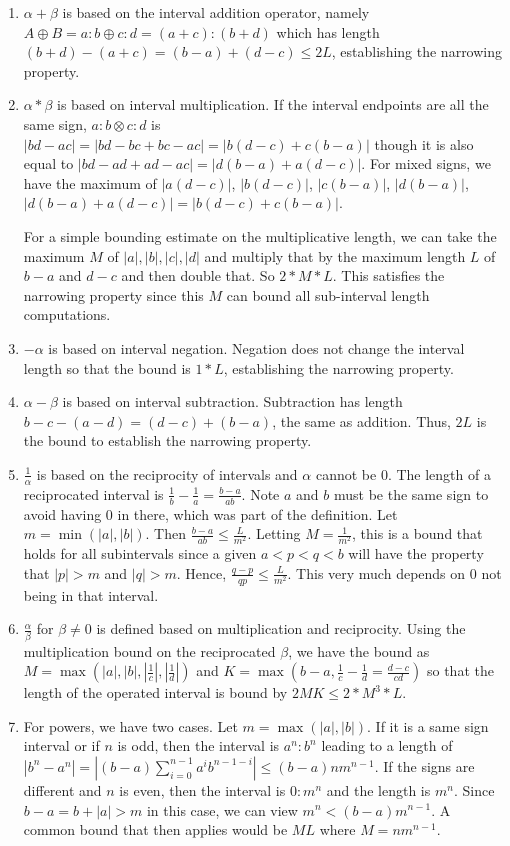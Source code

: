 \documentclass[12pt]{article}
\begin{document}
\begin{enumerate}
    \item $\alpha+\beta$ is based on the interval addition operator, namely $A \oplus B = a:b \oplus c:d = (a+c):(b+d)$ which has length $(b+d) - (a+c) = (b-a) + (d-c) \leq 2L$, establishing the narrowing property. 
    \item $\alpha * \beta$ is based on interval multiplication. If the interval endpoints are all the same sign, $a:b \otimes c:d$ is $|bd-ac| = |bd -bc + bc -ac| =  |b(d-c) + c(b-a)|$ though it is also equal to $|bd - ad + ad - ac| = |d(b-a) + a(d-c)|$. For mixed signs, we have the maximum of $|a(d-c)|$, $|b(d-c)|$, $|c(b-a)|$, $|d(b-a)|$, $|d(b-a)+a(d-c)| = |b(d-c) + c(b-a)|$. 
    
    For a simple bounding estimate on the multiplicative length, we can take the maximum $M$ of $|a|, |b|, |c|, |d|$ and multiply that by the maximum length $L$ of $b-a$ and $d-c$ and then double that. So $2*M*L$. This satisfies the narrowing property since this $M$ can bound all sub-interval length computations.
    \item $-\alpha$ is based on interval negation. Negation does not change the interval length so that the bound is $1*L$, establishing the narrowing property. 
    \item $\alpha - \beta$ is based on interval subtraction. Subtraction has length $b-c - (a-d) = (d-c) + (b-a)$, the same as addition. Thus, $2L$ is the bound to establish the narrowing property. 
    \item $\frac{1}{\alpha}$ is based on the reciprocity of intervals and $\alpha$ cannot be $0$. The length of a reciprocated interval is $\frac{1}{b} - \frac{1}{a} = \tfrac{b-a}{ab}$. Note $a$ and $b$ must be the same sign to avoid having 0 in there, which was part of the definition. Let $m = \min(|a|, |b|)$. Then $\tfrac{b-a}{ab} \leq \tfrac{L}{m^2}$. Letting $M = \tfrac{1}{m^2}$, this is a bound that holds for all subintervals since a given $a < p < q < b$ will have the property that $|p| > m$ and $|q| > m$. Hence, $\frac{q-p}{qp} \leq \frac{L}{m^2}$. This very much depends on $0$ not being in that interval. 
    \item $\tfrac{\alpha}{\beta}$ for $\beta \neq 0$ is defined based on multiplication and reciprocity. Using the multiplication bound on the reciprocated $\beta$, we have the bound as $M = \max(|a|, |b|, |\frac{1}{c}|, |\frac{1}{d}|)$ and $K= \max(b-a, \frac{1}{c} - \frac{1}{d}= \tfrac{d-c}{cd} )$ so that the length of the operated interval is bound by $2MK \leq 2*M^3*L$.
    \item For powers, we have two cases. Let $m = \max(|a|, |b|)$. If it is a same sign interval or if $n$ is odd, then the interval is $a^n : b^n$ leading to a length of $|b^n - a^n| = |(b-a)\sum_{i=0}^{n-1} a^i b^{n-1-i}| \leq (b-a)n m^{n-1}$. If the signs are different and $n$ is even, then the interval is $0:m^n$ and the length is $m^n$. Since $b-a = b+ |a| > m$ in this case, we can view $m^n < (b-a) m^{n-1}$. A common bound that then applies would be $M L$ where $M = n m^{n-1}$. 
    

\end{enumerate}
\end{document}
